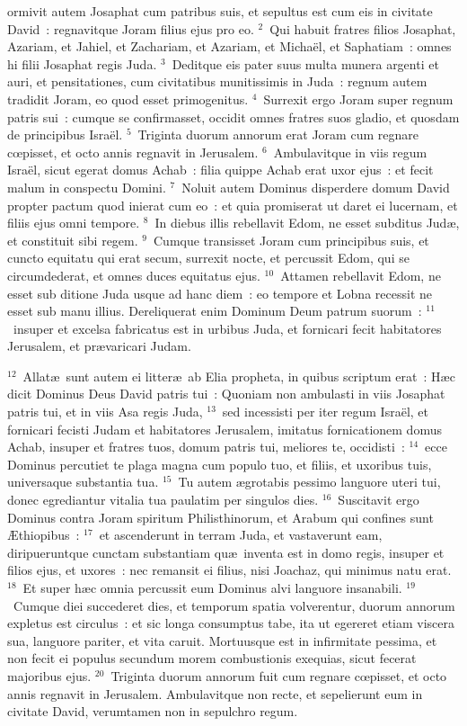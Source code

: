 \bchapter
{}ormivit autem Josaphat cum patribus suis, et sepultus est cum eis in civitate David~: regnavitque Joram filius ejus pro eo.
${}^{2}$~Qui habuit fratres filios Josaphat, Azariam, et Jahiel, et Zachariam, et Azariam, et Micha\"el, et Saphatiam~: omnes hi filii Josaphat regis Juda.
${}^{3}$~Deditque eis pater suus multa munera argenti et auri, et pensitationes, cum civitatibus munitissimis in Juda~: regnum autem tradidit Joram, eo quod esset primogenitus.
${}^{4}$~Surrexit ergo Joram super regnum patris sui~: cumque se confirmasset, occidit omnes fratres suos gladio, et quosdam de principibus Isra\"el.
${}^{5}$~Triginta duorum annorum erat Joram cum regnare cœpisset, et octo annis regnavit in Jerusalem.
${}^{6}$~Ambulavitque in viis regum Isra\"el, sicut egerat domus Achab~: filia quippe Achab erat uxor ejus~: et fecit malum in conspectu Domini.
${}^{7}$~Noluit autem Dominus disperdere domum David propter pactum quod inierat cum eo~: et quia promiserat ut daret ei lucernam, et filiis ejus omni tempore.
${}^{8}$~In diebus illis rebellavit Edom, ne esset subditus Jud\ae , et constituit sibi regem.
${}^{9}$~Cumque transisset Joram cum principibus suis, et cuncto equitatu qui erat secum, surrexit nocte, et percussit Edom, qui se circumdederat, et omnes duces equitatus ejus.
${}^{10}$~Attamen rebellavit Edom, ne esset sub ditione Juda usque ad hanc diem~: eo tempore et Lobna recessit ne esset sub manu illius. Dereliquerat enim Dominum Deum patrum suorum~:
${}^{11}$~insuper et excelsa fabricatus est in urbibus Juda, et fornicari fecit habitatores Jerusalem, et pr\ae varicari Judam.


${}^{12}$~Allat\ae\ sunt autem ei litter\ae\ ab Elia propheta, in quibus scriptum erat~: H\ae c dicit Dominus Deus David patris tui~: Quoniam non ambulasti in viis Josaphat patris tui, et in viis Asa regis Juda,
${}^{13}$~sed incessisti per iter regum Isra\"el, et fornicari fecisti Judam et habitatores Jerusalem, imitatus fornicationem domus Achab, insuper et fratres tuos, domum patris tui, meliores te, occidisti~:
${}^{14}$~ecce Dominus percutiet te plaga magna cum populo tuo, et filiis, et uxoribus tuis, universaque substantia tua.
${}^{15}$~Tu autem \ae grotabis pessimo languore uteri tui, donec egrediantur vitalia tua paulatim per singulos dies.
${}^{16}$~Suscitavit ergo Dominus contra Joram spiritum Philisthinorum, et Arabum qui confines sunt \AE thiopibus~:
${}^{17}$~et ascenderunt in terram Juda, et vastaverunt eam, diripueruntque cunctam substantiam qu\ae\ inventa est in domo regis, insuper et filios ejus, et uxores~: nec remansit ei filius, nisi Joachaz, qui minimus natu erat.
${}^{18}$~Et super h\ae c omnia percussit eum Dominus alvi languore insanabili.
${}^{19}$~Cumque diei succederet dies, et temporum spatia volverentur, duorum annorum expletus est circulus~: et sic longa consumptus tabe, ita ut egereret etiam viscera sua, languore pariter, et vita caruit. Mortuusque est in infirmitate pessima, et non fecit ei populus secundum morem combustionis exequias, sicut fecerat majoribus ejus.
${}^{20}$~Triginta duorum annorum fuit cum regnare cœpisset, et octo annis regnavit in Jerusalem. Ambulavitque non recte, et sepelierunt eum in civitate David, verumtamen non in sepulchro regum.


